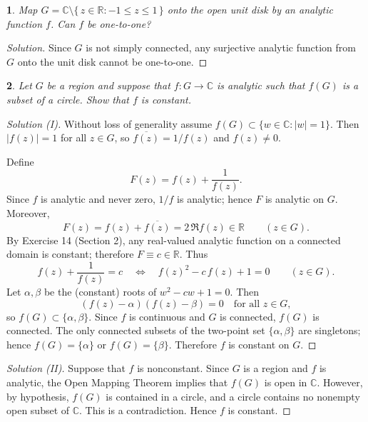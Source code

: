 \documentclass[12pt, a4paper]{report}
\theoremstyle{spaced}
\newtheorem{exercise}{}
\newcommand{\setexercise}[1]{\setcounter{exercise}{#1-1}}
\begin{document}
\setexercise{16}
\begin{exercise}
	Map \(G=\mathbb{C}\setminus\{\,z\in\mathbb{R}:-1\le z\le 1\,\}\) onto the open unit disk by an analytic function \(f\).
	Can \(f\) be one-to-one?
\end{exercise}

\begin{proof}[Solution]
	Since \(G\) is not simply connected, any surjective analytic function from \(G\) onto the unit disk cannot be one-to-one.
\end{proof}


\newpage

\setexercise{17}
\begin{exercise}
	Let \(G\) be a region and suppose that \(f:G\to\mathbb{C}\) is analytic such that \(f(G)\) is a subset of a circle.
	Show that \(f\) is constant.
\end{exercise}

\begin{proof}[Solution (I)]
	Without loss of generality assume $f(G)\subset\{w\in\mathbb C:|w|=1\}$.
	Then $|f(z)|=1$ for all $z\in G$, so $\overline{f(z)}=1/f(z)$ and $f(z)\neq 0$.

	Define
	\[
		F(z)=f(z)+\frac{1}{f(z)}.
	\]
	Since $f$ is analytic and never zero, $1/f$ is analytic; hence $F$ is analytic on $G$.
	Moreover,
	\[
		F(z)=f(z)+\overline{f(z)}=2\,\Re f(z)\in \mathbb R\qquad(z\in G).
	\]
	By Exercise 14 (Section 2), any real-valued analytic function on a connected domain is constant; therefore $F\equiv c\in\mathbb R$.
	Thus
	\[
		f(z)+\frac{1}{f(z)}=c \quad\Longleftrightarrow\quad f(z)^2-c\,f(z)+1=0\qquad(z\in G).
	\]
	Let $\alpha,\beta$ be the (constant) roots of $w^2-cw+1=0$. Then
	\[
		(f(z)-\alpha)(f(z)-\beta)=0 \quad\text{for all }z\in G,
	\]
	so $f(G)\subset\{\alpha,\beta\}$.
	Since $f$ is continuous and $G$ is connected, $f(G)$ is connected. The only connected subsets of the two-point set $\{\alpha,\beta\}$ are singletons; hence $f(G)=\{\alpha\}$ or $f(G)=\{\beta\}$. Therefore $f$ is constant on $G$.
\end{proof}

\begin{proof}[Solution (II)]
	Suppose that $f$ is nonconstant. Since $G$ is a region and $f$ is analytic,
	the Open Mapping Theorem implies that $f(G)$ is open in $\mathbb{C}$.
	However, by hypothesis, $f(G)$ is contained in a circle, and a circle
	contains no nonempty open subset of $\mathbb{C}$. This is a contradiction.
	Hence $f$ is constant.
\end{proof}
\end{document}
